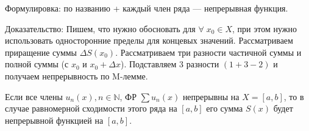 \begin{col-answer-preambule}
  \begin{plan}
  	\item Формулировка: по названию + каждый член ряда — непрерывная функция.
  	\item Доказательство:
    \subitem Пишем, что нужно обосновать для $\forall \; x_0 \in X$, при этом нужно использовать односторонние пределы для концевых значений.
    \subitem Рассматриваем приращение суммы $\Delta S(x_0)$.
    \subitem Рассматриваем три разности частичной суммы и полной суммы (с $x_0$ и $x_0 + \Delta x$).
    \subitem Подставляем $3$ разности $(1 + 3 - 2)$ и получаем непрерывность по M-лемме.
  \end{plan}
\end{col-answer-preambule}
\begin{theorem}
	Если все члены $u_n(x), n \in \mathbb{N}$, ФР $\sum u_n(x)$ непрерывны на $X = [a,b]$, то в случае равномерной сходимости этого ряда на $[a,b]$ его сумма $S(x)$ будет непрерывной функцией на $[a,b]$.
\end{theorem}
